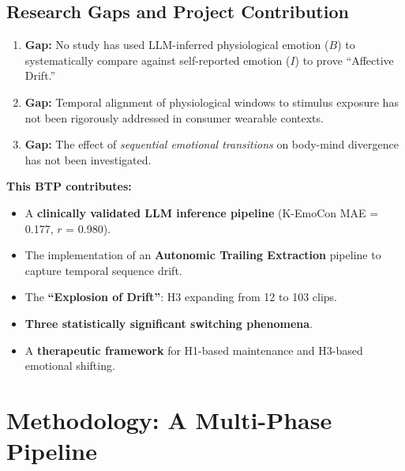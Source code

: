 \documentclass[11pt, a4paper]{report}
\begin{document}
\section{Research Gaps and Project Contribution}
\begin{enumerate}
    \item \textbf{Gap:} No study has used LLM-inferred physiological emotion ($B$) to systematically compare against self-reported emotion ($I$) to prove ``Affective Drift.''
    \item \textbf{Gap:} Temporal alignment of physiological windows to stimulus exposure has not been rigorously addressed in consumer wearable contexts.
    \item \textbf{Gap:} The effect of \textit{sequential emotional transitions} on body-mind divergence has not been investigated.
\end{enumerate}
\textbf{This BTP contributes:}
\begin{itemize}
    \item A \textbf{clinically validated LLM inference pipeline} (K-EmoCon MAE = 0.177, $r$ = 0.980).
    \item The implementation of an \textbf{Autonomic Trailing Extraction} pipeline to capture temporal sequence drift.
    \item The \textbf{``Explosion of Drift''}: H3 expanding from 12 to 103 clips.
    \item \textbf{Three statistically significant switching phenomena}.
    \item A \textbf{therapeutic framework} for H1-based maintenance and H3-based emotional shifting.
\end{itemize}


\chapter{Methodology: A Multi-Phase Pipeline}
\label{chap:methodology}
\end{document}
